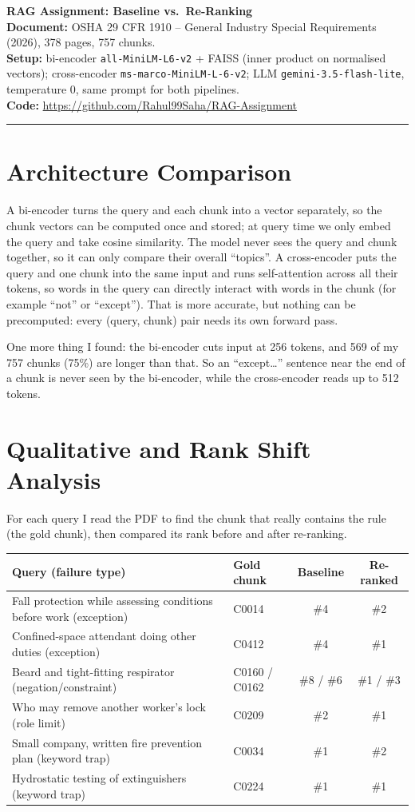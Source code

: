 \documentclass[11pt,a4paper]{article}
\begin{document}
{\LARGE\bfseries\color{hd} RAG Assignment: Baseline vs.\ Re-Ranking}\\[2pt]
\textbf{Document:} OSHA 29 CFR 1910 -- General Industry Special Requirements (2026), 378 pages, 757 chunks.\\
\textbf{Setup:} bi-encoder \texttt{all-MiniLM-L6-v2} + FAISS (inner product on normalised vectors); cross-encoder \texttt{ms-marco-MiniLM-L-6-v2}; LLM \texttt{gemini-3.5-flash-lite}, temperature 0, same prompt for both pipelines.\\
\textbf{Code:} \url{https://github.com/Rahul99Saha/RAG-Assignment}
\hrule

\section{Architecture Comparison}
A bi-encoder turns the query and each chunk into a vector separately, so the chunk vectors can be computed once and stored; at query time we only embed the query and take cosine similarity. The model never sees the query and chunk together, so it can only compare their overall ``topics''. A cross-encoder puts the query and one chunk into the same input and runs self-attention across all their tokens, so words in the query can directly interact with words in the chunk (for example ``not'' or ``except''). That is more accurate, but nothing can be precomputed: every (query, chunk) pair needs its own forward pass.

One more thing I found: the bi-encoder cuts input at 256 tokens, and 569 of my 757 chunks (75\%) are longer than that. So an ``except\ldots'' sentence near the end of a chunk is never seen by the bi-encoder, while the cross-encoder reads up to 512 tokens.

\section{Qualitative and Rank Shift Analysis}
For each query I read the PDF to find the chunk that really contains the rule (the gold chunk), then compared its rank before and after re-ranking.

\begin{center}
\small
\begin{tabular}{@{}p{5.2cm}lcc@{}}
\toprule
Query (failure type) & Gold chunk & Baseline & Re-ranked\\
\midrule
Fall protection while assessing conditions before work (exception) & C0014 & \#4 & \#2\\
Confined-space attendant doing other duties (exception) & C0412 & \#4 & \#1\\
Beard and tight-fitting respirator (negation/constraint) & C0160 / C0162 & \#8 / \#6 & \#1 / \#3\\
Who may remove another worker's lock (role limit) & C0209 & \#2 & \#1\\
Small company, written fire prevention plan (keyword trap) & C0034 & \#1 & \#2\\
Hydrostatic testing of extinguishers (keyword trap) & C0224 & \#1 & \#1\\
\bottomrule
\end{tabular}
\end{center}
\end{document}
